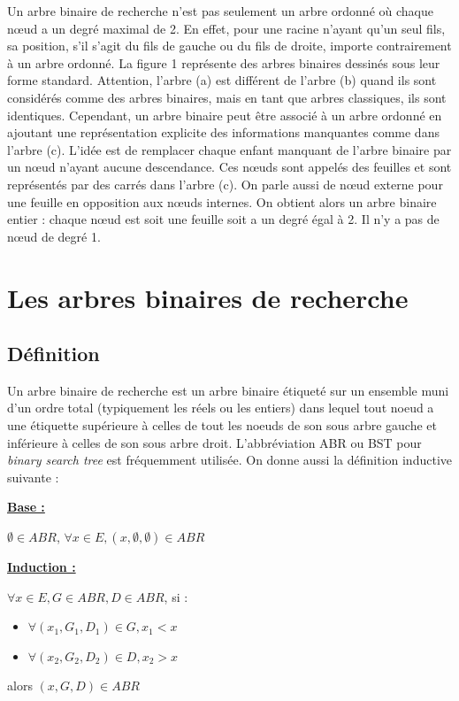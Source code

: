 \documentclass{report}
\begin{document}
Un arbre binaire de recherche n'est pas seulement un arbre ordonné où chaque nœud a un degré maximal de 2.  En effet, pour une racine n'ayant qu'un seul fils, sa position, s'il s'agit du fils de gauche ou du fils de droite, importe contrairement à un arbre ordonné.
La figure 1 représente des arbres binaires dessinés sous leur forme standard. Attention, l'arbre (a) est différent de l'arbre (b) quand ils sont considérés comme des arbres binaires, mais en tant que arbres classiques, ils sont identiques.
Cependant, un arbre binaire peut être associé à un arbre ordonné en ajoutant une représentation explicite des informations manquantes comme dans l'arbre (c). L'idée est de remplacer chaque enfant manquant de l'arbre binaire par un nœud n'ayant aucune descendance. Ces nœuds sont appelés des feuilles et sont représentés par des carrés dans l'arbre (c). On parle aussi de nœud externe pour une feuille en opposition aux nœuds internes. On obtient alors un arbre binaire entier : chaque nœud est soit une feuille soit a un degré égal à 2. Il n'y a pas de nœud de degré 1.





\section{Les arbres binaires de recherche}
\subsection{Définition}
Un arbre binaire de recherche est un arbre binaire étiqueté sur un ensemble muni d'un ordre total (typiquement les réels ou les entiers) dans lequel tout noeud a une étiquette supérieure à celles de tout les noeuds de son sous arbre gauche et inférieure à celles de son sous arbre droit. L'abbréviation ABR ou BST pour \textit{binary search tree} est fréquemment utilisée. On donne aussi la définition inductive suivante :
\begin{flushleft}
    \bf
    \underline{Base :}
    
\end{flushleft}
$\emptyset \in ABR$, $\forall x \in E, (x,\emptyset, \emptyset) \in ABR$
\begin{flushleft}
    \bf
    \underline{Induction :}
\end{flushleft}
    $\forall x \in E, G \in ABR, D \in ABR$, si :
    \begin{itemize}
        \item $\forall (x_1,G_1,D_1) \in G, x_1 < x$
        \item $\forall (x_2,G_2,D_2) \in D, x_2 > x$
    \end{itemize}
    alors $(x,G,D) \in ABR$
\end{document}
